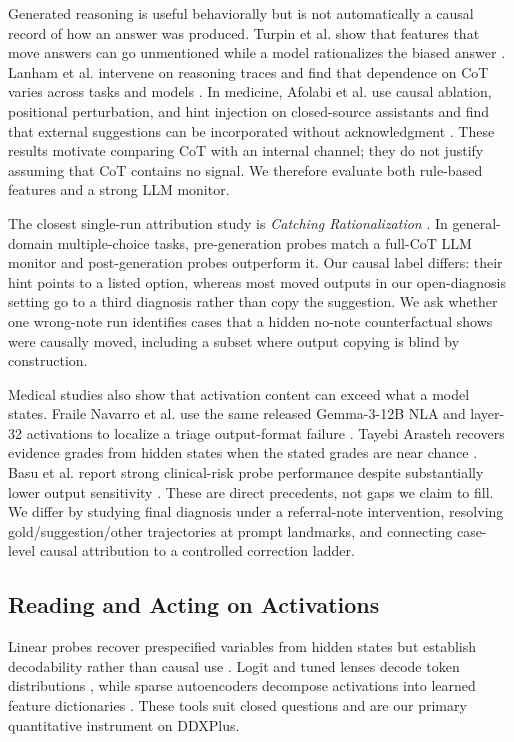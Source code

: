 Generated reasoning is useful behaviorally but is not automatically a causal
record of how an answer was produced. Turpin et al. show that features that
move answers can go unmentioned while a model rationalizes the biased answer
\cite{turpin2023say}. Lanham et al. intervene on reasoning traces and find
that dependence on CoT varies across tasks and models
\cite{lanham2023measuring}. In medicine, Afolabi et al. use causal ablation,
positional perturbation, and hint injection on closed-source assistants and
find that external suggestions can be incorporated without acknowledgment
\cite{afolabi2026faithful}. These results motivate comparing CoT with an
internal channel; they do not justify assuming that CoT contains no signal.
We therefore evaluate both rule-based features and a strong LLM monitor.

The closest single-run attribution study is \emph{Catching Rationalization}
\cite{mirtaheri2026rationalization}. In general-domain multiple-choice tasks,
pre-generation probes match a full-CoT LLM monitor and post-generation probes
outperform it. Our causal label differs: their hint points to a listed option,
whereas most moved outputs in our open-diagnosis setting go to a third
diagnosis rather than copy the suggestion. We ask whether one wrong-note run
identifies cases that a hidden no-note counterfactual shows were causally
moved, including a subset where output copying is blind by construction.

Medical studies also show that activation content can exceed what a model
states. Fraile Navarro et al. use the same released Gemma-3-12B NLA and
layer-32 activations to localize a triage output-format failure
\cite{frailenavarro2026internal}. Tayebi Arasteh recovers evidence grades from
hidden states when the stated grades are near chance
\cite{tayebi2026evidence}. Basu et al. report strong clinical-risk probe
performance despite substantially lower output sensitivity
\cite{basu2026risk}. These are direct precedents, not gaps we claim to fill.
We differ by studying final diagnosis under a referral-note intervention,
resolving gold/suggestion/other trajectories at prompt landmarks, and
connecting case-level causal attribution to a controlled correction ladder.

\subsection{Reading and Acting on Activations}
\label{sec:related-internals}

Linear probes recover prespecified variables from hidden states but establish
decodability rather than causal use \cite{belinkov2022probing}. Logit and tuned
lenses decode token distributions \cite{belrose2023tunedlens}, while sparse
autoencoders decompose activations into learned feature dictionaries
\cite{cunningham2023sae, bricken2023monosemanticity}. These tools suit closed
questions and are our primary quantitative instrument on DDXPlus.


